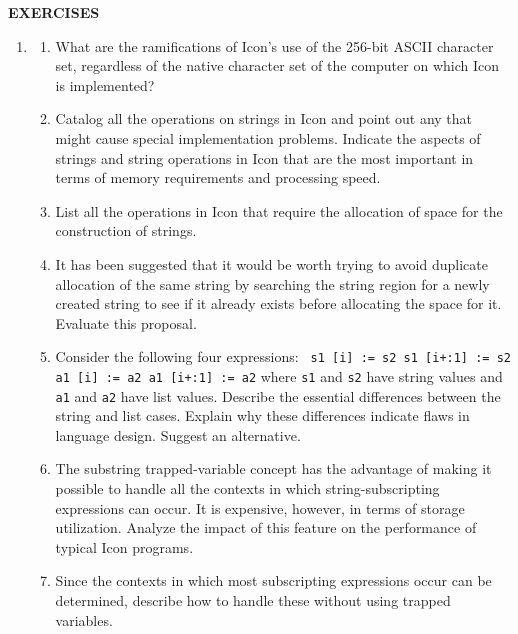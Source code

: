 {\sffamily\bfseries
EXERCISES}

\liststyleLv
\begin{enumerate}
\item \begin{enumerate}

\item What are the ramifications of Icon's use of the 256-bit ASCII
character set, regardless of the {\textquotedbl}native{\textquotedbl}
character set of the computer on which Icon is implemented?

\item Catalog all the operations on strings in Icon and point out any
that might cause special implementation problems.  Indicate the
aspects of strings and string operations in Icon that are the most
important in terms of memory requirements and processing speed.

\item List all the operations in Icon that require the allocation of
space for the construction of strings.

\item It has been suggested that it would be worth trying to avoid
duplicate allocation of the same string by searching the string region
for a newly created string to see if it already exists before
allocating the space for it. Evaluate this proposal.

\item 
Consider the following four expressions:\newline
\texttt{ s1 [i] := s2\newline
 s1 [i+:1] := s2\newline
 a1 [i] := a2\newline
 a1 [i+:1] := a2}\newline
where \texttt{s1} and \texttt{s2} have string values and \texttt{a1}
and \texttt{a2} have list values. Describe the essential differences
between the string and list cases. Explain why these differences
indicate flaws in language design. Suggest an alternative.

\item The substring trapped-variable concept has the advantage of
making it possible to handle all the contexts in which
string-subscripting expressions can occur. It is expensive, however,
in terms of storage utilization. Analyze the impact of this feature on
the performance of {\textquotedbl}typical{\textquotedbl} Icon
programs.

\item Since the contexts in which most subscripting expressions occur
can be determined, describe how to handle these without using trapped
variables.


\end{enumerate}
\end{enumerate}
